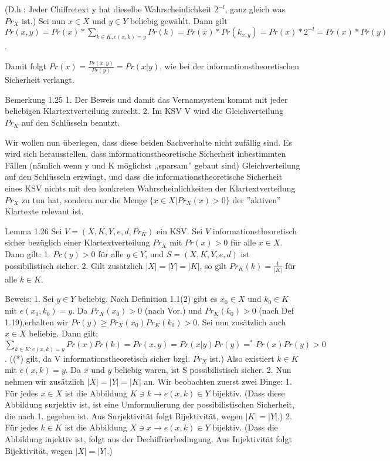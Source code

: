 \documentclass[a4paper]{article}
\begin{document}
\begin{multicols}{3}
    (D.h.: Jeder Chiffretext y hat dieselbe Wahrscheinlichkeit $2^{-l}$, ganz gleich was $Pr_X$ ist.)
    Sei nun $x\in X$ und $y\in Y$ beliebig gewählt. Dann gilt $Pr(x,y) = Pr(x)*\sum_{k\in K, e(x,k)=y} Pr(k) = Pr(x)*Pr(k_{x,y}) = Pr(x)* 2^{-l}= Pr(x)*Pr(y)$.

    Damit folgt $Pr(x)=\frac{Pr(x,y)}{Pr(y)}= Pr(x|y)$, wie bei der informationstheoretischen Sicherheit verlangt.

    Bemerkung 1.25
    1. Der Beweis und damit das Vernamsystem kommt mit jeder beliebigen Klartextverteilung zurecht.
    2. Im KSV V wird die Gleichverteilung $Pr_K$ auf den Schlüsseln benutzt.

    Wir wollen nun überlegen, dass diese beiden Sachverhalte nicht zufällig sind.  Es wird sich herausstellen, dass informationstheoretische Sicherheit inbestimmten  Fällen (nämlich wenn y und K möglichst ,,sparsam'' gebaut sind) Gleichverteilung auf den Schlüsseln erzwingt, und dass die informationstheoretische Sicherheit eines KSV nichts mit den konkreten Wahrscheinlichkeiten der Klartextverteilung $Pr_X$ zu tun hat, sondern nur die Menge $\{x\in X|Pr_X(x)> 0\}$ der ''aktiven'' Klartexte relevant ist.

    Lemma 1.26 Sei $V=(X,K,Y,e,d,Pr_K)$ ein KSV. Sei $V$ informationstheoretisch sicher bezüglich einer Klartextverteilung $Pr_X$ mit $Pr(x)>0$ für alle $x\in X$. Dann gilt:
    1. $Pr(y)>0$ für alle $y\in Y$, und $S=(X,K,Y,e,d)$ ist possibilistisch sicher.
    2. Gilt zusätzlich $|X|=|Y|=|K|$, so gilt $Pr_K(k)=\frac{1}{|K|}$ für alle $k\in K$.

    Beweis:
    1. Sei $y\in Y$ beliebig. Nach Definition 1.1(2) gibt es $x_0\in X$ und $k_0\in K$ mit $e(x_0,k_0)=y$. Da $Pr_X(x_0)>0$ (nach Vor.) und $Pr_K(k_0)>0$ (nach Def 1.19),erhalten wir $Pr(y)\geq Pr_X(x_0)Pr_K(k_0)>0$. Sei nun zusätzlich auch $x\in X$ beliebig. Dann gilt: $\sum_{k\in K:e(x,k)=y} Pr(x)Pr(k)= Pr(x,y)= Pr(x|y)Pr(y)=^* Pr(x)Pr(y)> 0$. ((*) gilt, da V informationstheoretisch sicher bzgl. $Pr_X$ ist.) Also existiert $k\in K$ mit $e(x,k)=y$. Da $x$ und $y$ beliebig waren, ist S possibilistisch sicher.
    2. Nun nehmen wir zusätzlich $|X|=|Y|=|K|$ an. Wir beobachten zuerst zwei Dinge:
    1. Für jedes $x\in X$ ist die Abbildung $K\ni k \rightarrow e(x,k)\in Y$  bijektiv. (Dass diese Abbildung surjektiv ist, ist eine Umformulierung der possibilistischen Sicherheit, die nach 1. gegeben ist. Aus Surjektivität folgt Bijektivität, wegen $|K|=|Y|$.)
    2. Für jedes $k\in K$ ist die Abbildung $X\ni x \rightarrow e(x,k)\in Y$ bijektiv. (Dass die Abbildung injektiv ist, folgt aus der Dechiffrierbedingung. Aus Injektivität folgt Bijektivität, wegen $|X|=|Y|$.)


\end{multicols}
\end{document}
